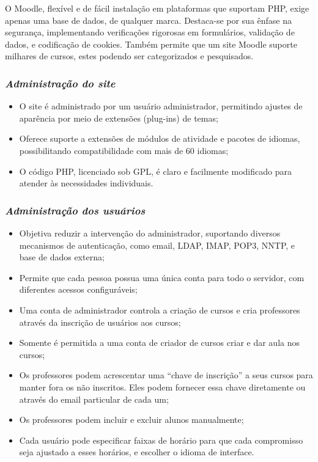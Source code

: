 O Moodle, flexível e de fácil instalação em plataformas que suportam PHP, exige apenas uma base de dados, de qualquer marca. Destaca-se por sua ênfase na segurança, implementando verificações rigorosas em formulários, validação de dados, e codificação de cookies. Também permite que um site Moodle suporte milhares de cursos, estes podendo ser categorizados e pesquisados.

\subsubsection{\textbf{\textit{Administração do site}}}

\begin{itemize}
    \item O site é administrado por um usuário administrador, permitindo ajustes de aparência por meio de extensões (plug-ins) de temas;
    \item Oferece suporte a extensões de módulos de atividade e pacotes de idiomas, possibilitando compatibilidade com mais de 60 idiomas; 
    \item O código PHP, licenciado sob GPL, é claro e facilmente modificado para atender às necessidades individuais.
\end{itemize}

\subsubsection{\textbf{\textit{Administração dos usuários}}}

\begin{itemize}
    \item Objetiva reduzir a intervenção do administrador, suportando diversos mecanismos de autenticação, como email, LDAP, IMAP, POP3, NNTP, e base de dados externa;
    \item Permite que cada pessoa possua uma única conta para todo o servidor, com diferentes acessos configuráveis; 
    \item Uma conta de administrador controla a criação de cursos e cria professores através da inscrição de usuários aos cursos;
    \item Somente é permitida a uma conta de criador de cursos criar e dar aula nos cursos;
    \item Os professores podem acrescentar uma “chave de inscrição” a seus cursos para manter fora os não inscritos. Eles podem fornecer essa chave diretamente ou através do email particular de cada um;
    \item Os professores podem incluir e excluir alunos manualmente;
    \item Cada usuário pode especificar faixas de horário para que cada compromisso seja ajustado a esses horários, e escolher o idioma de interface.
\end{itemize}


